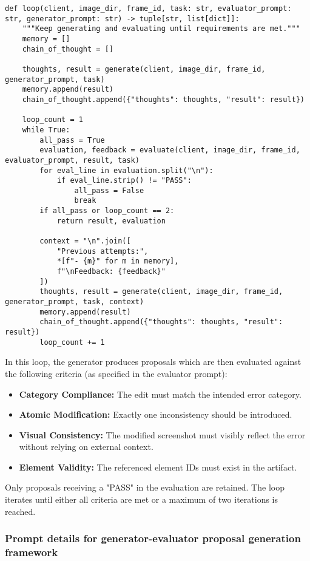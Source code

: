 \begin{lstlisting}
def loop(client, image_dir, frame_id, task: str, evaluator_prompt: str, generator_prompt: str) -> tuple[str, list[dict]]:
    """Keep generating and evaluating until requirements are met."""
    memory = []
    chain_of_thought = []
    
    thoughts, result = generate(client, image_dir, frame_id, generator_prompt, task)
    memory.append(result)
    chain_of_thought.append({"thoughts": thoughts, "result": result})
    
    loop_count = 1
    while True:
        all_pass = True
        evaluation, feedback = evaluate(client, image_dir, frame_id, evaluator_prompt, result, task)
        for eval_line in evaluation.split("\n"):
            if eval_line.strip() != "PASS":
                all_pass = False
                break
        if all_pass or loop_count == 2:
            return result, evaluation
            
        context = "\n".join([
            "Previous attempts:",
            *[f"- {m}" for m in memory],
            f"\nFeedback: {feedback}"
        ])
        thoughts, result = generate(client, image_dir, frame_id, generator_prompt, task, context)
        memory.append(result)
        chain_of_thought.append({"thoughts": thoughts, "result": result})
        loop_count += 1
\end{lstlisting}

In this loop, the generator produces proposals which are then evaluated against the following criteria (as specified in the evaluator prompt):
\begin{itemize}
    \item \textbf{Category Compliance:} The edit must match the intended error category.
    \item \textbf{Atomic Modification:} Exactly one inconsistency should be introduced.
    \item \textbf{Visual Consistency:} The modified screenshot must visibly reflect the error without relying on external context.
    \item \textbf{Element Validity:} The referenced element IDs must exist in the artifact.
\end{itemize}

Only proposals receiving a "PASS" in the evaluation are retained. The loop iterates until either all criteria are met or a maximum of two iterations is reached.

\subsubsection{Prompt details for generator-evaluator proposal generation framework}

